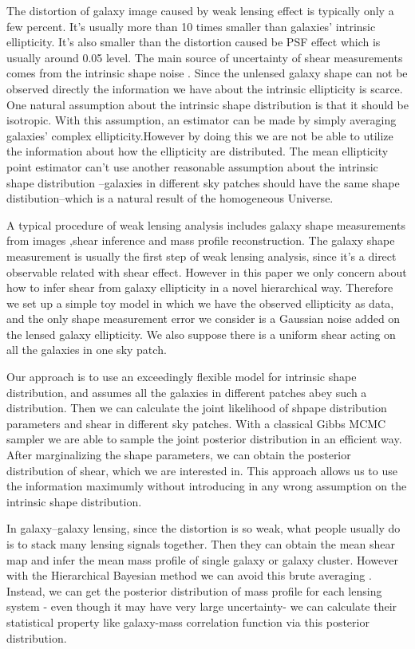 \documentclass[useAMS,usenatbib]{mn2e}
\begin{document}
The distortion of galaxy image caused by weak lensing effect is typically only a few percent.
It's usually more than 10 times smaller than galaxies' intrinsic ellipticity. It's also smaller than the distortion caused
be PSF effect which is usually around 0.05 level. The main source of uncertainty of shear measurements comes from the intrinsic shape noise
. Since the unlensed galaxy shape can not be observed directly the information
we have about the intrinsic ellipticity is scarce. One natural assumption about the intrinsic shape distribution is that 
it should be isotropic. With this assumption, an estimator can be made by simply averaging galaxies' complex
ellipticity.However by doing this we are not be able to utilize the
information about how the ellipticity are distributed. The mean ellipticity
point estimator can't use another reasonable assumption about the intrinsic shape distribution --galaxies in different sky patches should have
the same shape distibution--which is a natural result of the homogeneous Universe.

A typical procedure of weak lensing analysis  includes galaxy shape measurements from images
,shear inference and mass profile reconstruction. The galaxy shape measurement is usually the
first step of weak lensing analysis, since it's a direct observable related with shear effect. However
in this paper we only concern about how to infer shear from galaxy
ellipticity in a novel hierarchical way. Therefore we set up a simple toy model in which we have the observed ellipticity as
data, and the only shape measurement error we consider is a Gaussian noise
added on the lensed galaxy ellipticity. We also suppose there is a uniform shear
acting on all the galaxies in one sky patch.

Our approach is to use an exceedingly flexible model for intrinsic
shape distribution, and assumes all the galaxies in different patches
abey such a distribution. Then we can calculate the joint likelihood
of shpape distribution parameters and shear in different sky patches. With
a classical Gibbs MCMC sampler we are able to sample the joint posterior distribution
in an efficient way. After marginalizing the shape parameters, we can obtain
the posterior distribution of shear, which we are interested in. This
approach allows us to use the information maximumly without introducing
in any wrong assumption on the intrinsic shape distribution.

In galaxy--galaxy lensing, since the distortion is so weak, what people
usually do is to stack many lensing signals together. Then they can obtain the mean
shear map and infer the mean mass profile of single galaxy or galaxy
cluster. However with the Hierarchical Bayesian method we can avoid this brute averaging
. Instead, we can get the posterior distribution of mass profile for
each lensing system  - even though it may have very large uncertainty- we
can calculate their statistical property like galaxy-mass correlation
function via this posterior distribution.
\end{document}

